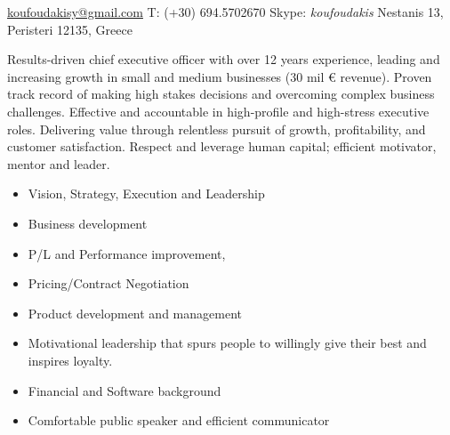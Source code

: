 \documentclass[10pt,a4paper]{article} %
\begin{document}
 



\noindent\href{mailto:koufoudakisy@gmail.com}{koufoudakisy@gmail.com}\bull %
\noindent T: (+30) 694.5702670 \bull %
\noindent Skype: \textit{koufoudakis}\bull %
\noindent Nestanis 13, Peristeri 12135, Greece %

\spacedhrule{0.9em}{-0.4em} %



\vspace{-1.3em} %

\begin{multicols}{2}  %
  \noindent
  Results-driven chief executive officer with over 12 years experience, leading and
  increasing growth in small and medium businesses (30 mil \euro{} revenue). Proven
  track record of making high stakes decisions and overcoming complex business challenges.
  Effective and accountable in high-profile and high-stress executive roles. Delivering
  value through relentless pursuit of growth, profitability, and customer satisfaction.
  Respect and leverage human capital; efficient motivator, mentor and leader.

  \begin{itemize}
  \item Vision, Strategy, Execution and Leadership
  \item Business development
  \item P/L and Performance improvement,
  \item Pricing/Contract Negotiation
  \item Product development and management
  \item Motivational leadership that spurs people to willingly give their best and inspires loyalty.
  \item Financial and Software background
  \item Comfortable public speaker and efficient communicator
  \end{itemize}


\end{multicols}
\end{document}

